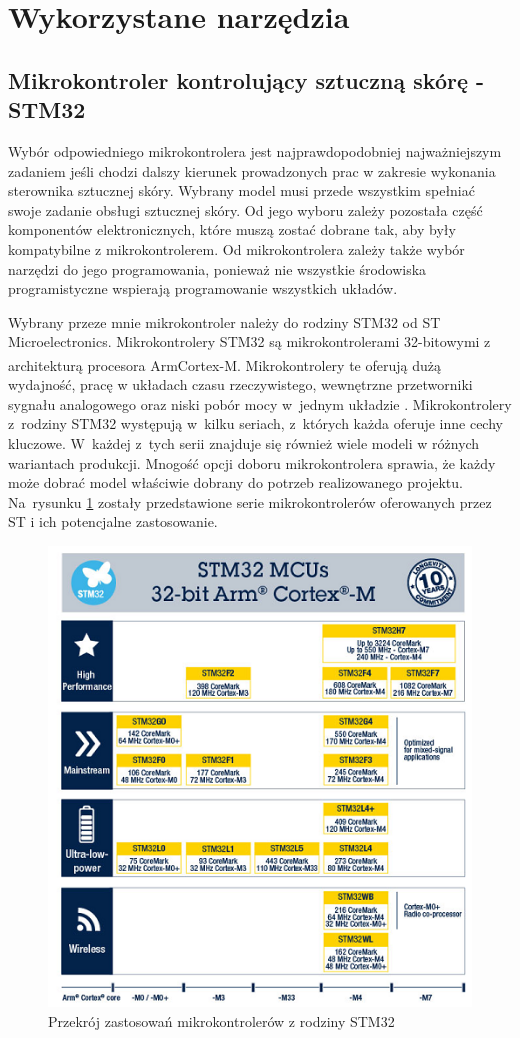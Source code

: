 \newpage
\section{Wykorzystane narzędzia}
\label{s_narzedzia}

\subsection{Mikrokontroler kontrolujący sztuczną skórę - STM32}

Wybór odpowiedniego mikrokontrolera jest najprawdopodobniej najważniejszym zadaniem jeśli chodzi dalszy kierunek prowadzonych prac w zakresie wykonania sterownika sztucznej skóry. Wybrany model musi przede wszystkim spełniać swoje zadanie obsługi sztucznej skóry. Od jego wyboru zależy pozostała część komponentów elektronicznych, które muszą zostać dobrane tak, aby były kompatybilne z mikrokontrolerem. 
Od mikrokontrolera zależy także wybór narzędzi do jego programowania, ponieważ nie wszystkie środowiska programistyczne wspierają programowanie wszystkich układów.

Wybrany przeze mnie mikrokontroler należy do rodziny STM32 od ST Microelectronics. Mikrokontrolery STM32 są mikrokontrolerami 32-bitowymi z architekturą procesora Arm\textsuperscript{\textregistered}Cortex\textsuperscript{\textregistered}-M. Mikrokontrolery te oferują dużą wydajność, pracę w układach czasu rzeczywistego, wewnętrzne przetworniki sygnału analogowego oraz niski pobór mocy w~jednym układzie \cite{b_site_STM32}. Mikrokontrolery z~rodziny STM32 występują w~kilku seriach, z~których każda oferuje inne cechy kluczowe. W~każdej z~tych serii znajduje się również wiele modeli w różnych wariantach produkcji. Mnogość opcji doboru mikrokontrolera sprawia, że każdy może dobrać model właściwie dobrany do potrzeb realizowanego projektu. Na~rysunku \ref{f_przekroj_stm} zostały przedstawione serie mikrokontrolerów oferowanych przez ST i ich potencjalne zastosowanie.

\begin{figure}[!h]
    \centering 
    \includegraphics[width=0.7\linewidth]{img/przekroj_stm.png}
    \caption{Przekrój zastosowań mikrokontrolerów z rodziny STM32 \cite{b_site_STM32}}
    \label{f_przekroj_stm}
\end{figure}

